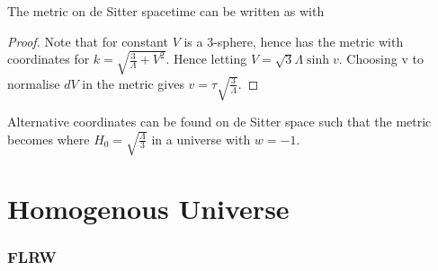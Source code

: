 \documentclass{article}
\begin{document}
\begin{prop}
The metric on de Sitter spacetime can be written as 
with 
\end{prop}
\begin{proof}
Note that for constant $V$ 
is a 3-sphere, hence has the metric 
with coordinates 
for $k=\sqrt{\frac{3}{\Lambda}+V^2}$. Hence letting $V=\sqrt{3}{\Lambda}\sinh v$. Choosing v to normalise $dV$ in the metric gives $v=\tau\sqrt{\frac{3}{\Lambda}}$. 
\end{proof}

\begin{prop}
Alternative coordinates can be found on de Sitter space such that the metric becomes 
where $H_0 = \sqrt{\frac{\Lambda}{3}}$ in a universe with $w=-1$. 
\end{prop}
\part{Homogenous Universe}
\section{FLRW}
\end{document}
